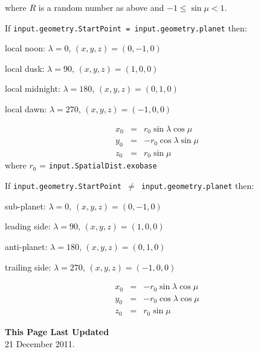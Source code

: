 \documentclass[11pt]{article}
\newcommand\descrip[1]{\textsf{\textbf{\large{#1}}}\\}
\begin{document}
\begin{compactenum}
\begin{compactenum}
\begin{equation}
    \end{equation}
    where $R$ is a random number as above and $-1 \leq \sin \mu < 1$.
  \end{compactenum}
\item If \texttt{input.geometry.StartPoint = input.geometry.planet} then:
  \begin{compactitem}
  \item local noon: $\lambda=0$\degr, $(x,y,z)=(0,-1,0)$
  \item local dusk: $\lambda=90$\degr, $(x,y,z)=(1,0,0)$
  \item local midnight: $\lambda=180$\degr, $(x,y,z)=(0,1,0)$
  \item local dawn: $\lambda=270$\degr, $(x,y,z)=(-1,0,0)$
  \end{compactitem}
  \begin{eqnarray}
  x_0 & = & r_0 \sin \lambda \cos \mu \\
  y_0 & = & -r_0 \cos \lambda \sin \mu \\
  z_0 & = & r_0 \sin \mu
  \end{eqnarray}
  where $r_0$ = \texttt{input.SpatialDist.exobase}
\item If \texttt{input.geometry.StartPoint $\neq$ input.geometry.planet}
then:  
  \begin{compactitem}
  \item sub-planet: $\lambda=0$\degr, $(x,y,z)=(0,-1,0)$
  \item leading side: $\lambda=90$\degr, $(x,y,z)=(1,0,0)$
  \item anti-planet: $\lambda=180$\degr, $(x,y,z)=(0,1,0)$
  \item trailing side: $\lambda=270$\degr, $(x,y,z)=(-1,0,0)$
  \end{compactitem}
  \begin{eqnarray}
  x_0 & = & -r_0 \sin \lambda \cos \mu \\
  y_0 & = & -r_0 \cos \lambda \cos \mu \\
  z_0 & = & r_0 \sin \mu
  \end{eqnarray}
\end{compactenum}

\descrip{This Page Last Updated}
21 December 2011.
\end{document}

